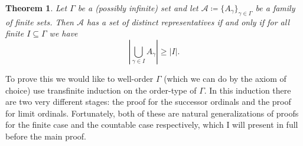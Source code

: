 \documentclass{article}
\theoremstyle{definition}
\theoremstyle{plain}
\newtheorem{thm}{Theorem}
\theoremstyle{definition}
\begin{document}
	
	\begin{thm}\label{thm:hall_infinite}
		Let $\Gamma$ be a (possibly infinite) set and let $\mathcal{A} \coloneqq \{A_\gamma\}_{\gamma\in\Gamma}$ be a family of finite sets. Then $\mathcal{A}$ has a set of distinct representatives if and only if for all finite $I\subseteq \Gamma$ we have
		\[
			\left|\bigcup_{\gamma\in I} A_\gamma\right| \geq |I|.
		\] 
	\end{thm}
	To prove this we would like to well-order $\Gamma$ (which we can do by the axiom of choice) use transfinite induction on the order-type of $\Gamma$. In this induction there are two very different stages: the proof for the successor ordinals and the proof for limit ordinals. Fortunately, both of these are natural generalizations of proofs for the finite case and the countable case respectively, which I will present in full before the main proof.
	
\end{document}
